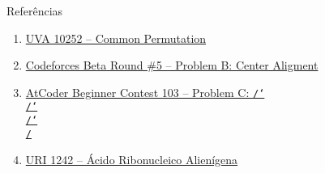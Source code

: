 \begin{frame}[fragile]{Referências}

    \begin{enumerate}
        \item \href{https://uva.onlinejudge.org/index.php?option=com_onlinejudge&Itemid=8&category=24&page=show_problem&problem=1193}{UVA 10252 -- Common Permutation}

        \item \href{https://codeforces.com/problemset/problem/5/B}{Codeforces Beta Round \#5 -- Problem B: Center Aligment}

        \item \href{https://atcoder.jp/contests/abc111/tasks/arc103\_a}{AtCoder Beginner Contest 103 -- Problem C: \texttt{/\char`\\/\char`\\/\char`\\/}}

        \item \href{https://www.urionlinejudge.com.br/judge/pt/problems/view/1242}{URI 1242 -- Ácido Ribonucleico Alienígena}
    \end{enumerate}

\end{frame}
